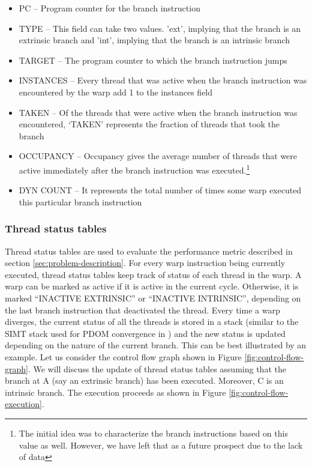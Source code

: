 \begin{itemize}
	\item PC -- Program counter for the branch instruction
	\item TYPE -- This field can take two values. 'ext', implying that the branch is an extrinsic branch and 'int', implying that the branch is an intrinsic branch 
	\item TARGET -- The program counter to which the branch instruction jumps
	\item INSTANCES -- Every thread that was active when the branch instruction was encountered by the warp add 1 to the instances field
	\item TAKEN -- Of the threads that were active when the branch instruction was encountered, `TAKEN' represents the fraction of threads that took the branch
	\item OCCUPANCY -- Occupancy gives the average number of threads that were active immediately after the branch instruction was executed.\footnote{The initial idea was to characterize the branch instructions based on this value as well. However, we have left that as a future prospect due to the lack of data}
	\item DYN COUNT -- It represents the total number of times some warp executed this particular branch instruction
\end{itemize}

	\subsubsection*{Thread status tables}
	Thread status tables are used to evaluate the performance metric described in section \ref{sec:problem-description}. For every warp instruction being currently executed, thread status tables keep track of status of each thread in the warp. A warp can be marked as active if it is active in the current cycle. Otherwise, it is marked ``INACTIVE EXTRINSIC'' or ``INACTIVE INTRINSIC'', depending on the last branch instruction that deactivated the thread. Every time a warp diverges, the current status of all the threads is stored in a stack (similar to the SIMT stack used for PDOM convergence in \cite{fung-micro}) and the new status is updated depending on the nature of the current branch. This can be best illustrated by an example. Let us consider the control flow graph shown in Figure \ref{fig:control-flow-graph}. We will discuss the update of thread status tables assuming that the branch at A (say an extrinsic branch) has been executed. Moreover, C is an intrinsic branch. The execution proceeds as shown in Figure \ref{fig:control-flow-execution}.

